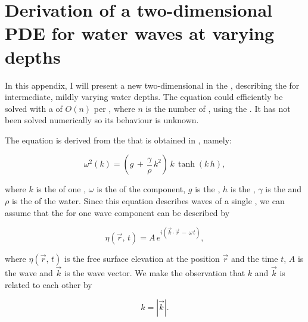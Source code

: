 \chapter{Derivation of a two-dimensional PDE for water waves at varying depths}

In this appendix, I will present a new two-dimensional \PDE in the , describing the  for intermediate, mildly varying water depths. The equation could efficiently be solved with a  of $O(n)$ per , where $n$ is the number of , using the \CFMM \citep{White1994}. It has not been solved numerically so its behaviour is unknown.

The equation is derived from the  that is obtained in , namely:

\begin{equation} \label{eq:dispersion}
\omega^2(k) = \left(g\,+\,\frac{\gamma}{\rho}\,k^2\right)\,k\,\tanh(k\,h),
\end{equation}

where $k$ is the  of one , $\omega$ is the  of the component, $g$ is the , $h$ is the , $\gamma$ is the  and $\rho$ is the  of the water. Since this equation describes waves of a single , we can assume that the  for one wave component can be described by

\begin{equation} \label{eq:component}
\eta(\vec{r},\,t) = A\,e^{i(\vec{k}\cdot\vec{r}\,-\,\omega\,t)},
\end{equation}

where $\eta(\vec{r},\,t)$ is the free surface elevation at the position $\vec{r}$ and the time $t$, $A$ is the wave  and $\vec{k}$ is the wave vector. We make the observation that $k$ and $\vec{k}$ is related to each other by

\begin{equation} \label{eq:kvectok}
k = \left|\vec{k}\right|.
\end{equation}

